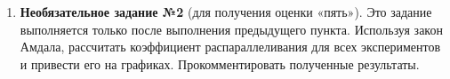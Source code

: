{\begin{enumerate}
процессора (ядер) во время выполнения программы при $N\;=\;N_2$ для всех использованных $M$. Для получения графика можно как написать скрипт, так и просто сделать скриншот диспетчера задач, указав на скриншоте моменты начала и окончания эксперимента (в отчёте нужно привести текст скрипта или название использованного диспетчера).
		\item\textbf{Необязательное задание №2} (для получения оценки «пять»). Это задание выполняется только после выполнения предыдущего пункта. Используя закон
Амдала, рассчитать коэффициент распараллеливания для всех экспериментов и привести его на графиках. Прокомментировать полученные результаты.
	\end{enumerate}
}